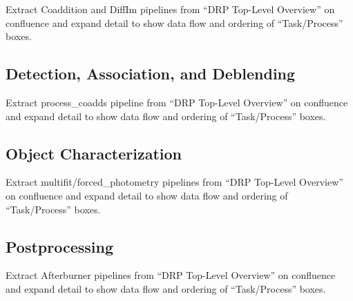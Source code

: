 \begin{note}
Extract Coaddition and DiffIm pipelines from ``DRP Top-Level Overview'' on confluence and expand detail to show data flow and ordering of ``Task/Process'' boxes.
\end{note}

\subsection{Detection, Association, and Deblending}

\begin{note}
Extract process\_coadds pipeline from ``DRP Top-Level Overview'' on confluence and expand detail to show data flow and ordering of ``Task/Process'' boxes.
\end{note}

\subsection{Object Characterization}

\begin{note}
Extract multifit/forced\_photometry pipelines from ``DRP Top-Level Overview'' on confluence and expand detail to show data flow and ordering of ``Task/Process'' boxes.
\end{note}

\subsection{Postprocessing}

\begin{note}
Extract Afterburner pipelines from ``DRP Top-Level Overview'' on confluence and expand detail to show data flow and ordering of ``Task/Process'' boxes.
\end{note}
